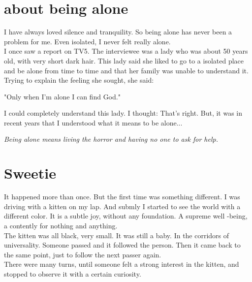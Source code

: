 \documentclass[11pt]{book}
\title{\textbf{Ana} \\ \vskip 1em \small The policy of silencing}
\author{Tatiana Balbi Fraga}
\date{}
\begin{document}
\maketitle
\thispagestyle{empty}

\chapter{about being alone}

I have always loved silence and tranquility. So being alone has never been a problem for me. Even isolated, I never felt really alone. \\

\noindent I once saw a report on TV5. The interviewee was a lady who was about 50 years old, with very short dark hair. This lady said she liked to go to a isolated place and be alone from time to time and that her family was unable to understand it. Trying to explain the feeling she sought, she said:

\noindent \begin{center} "Only when I'm alone I can find God." \end{center}

\noindent I could completely understand this lady. I thought: That's right. But, it was in recent years that I understood what it means to be alone...

\noindent \begin{center} \emph{Being alone means living the horror and having no one to ask for help.} \end{center}

\chapter{Sweetie}

\noindent It happened more than once. But the first time was something different. I was driving with a kitten on my lap. And submly I started to see the world with a different color. It is a subtle joy, without any foundation. A supreme well -being, a contently for nothing and anything. \\

\noindent The kitten was all black, very small. It was still a baby. In the corridors of universality. Someone passed and it followed the person. Then it came back to the same point, just to follow the next passer again. \\

\noindent There were many turns, until someone felt a strong interest in the kitten, and stopped to observe it with a certain curiosity. \\
\end{document}
